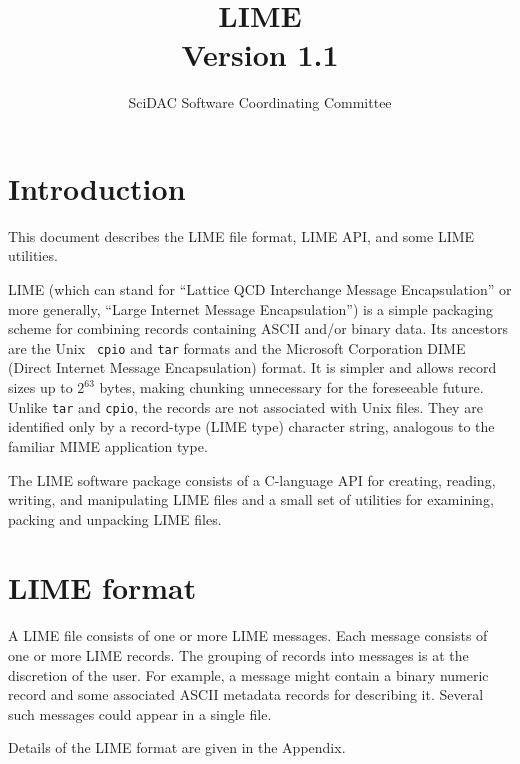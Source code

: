 \documentclass{article}
\begin{document}
\title{
   LIME \\{\large Version 1.1}
}
\author{ SciDAC Software Coordinating Committee}

\maketitle
\section{Introduction}

This document describes the LIME file format, LIME API, and some LIME
utilities.

LIME (which can stand for ``Lattice QCD Interchange Message
Encapsulation'' or more generally, ``Large Internet Message
Encapsulation'') is a simple packaging scheme for combining records
containing ASCII and/or binary data.  Its ancestors are the Unix {\tt
cpio} and {\tt tar} formats and the Microsoft Corporation DIME (Direct
Internet Message Encapsulation) format.  It is simpler and allows
record sizes up to $2^{63}$ bytes, making chunking unnecessary for the
foreseeable future.  Unlike {\tt tar} and {\tt cpio}, the records are
not associated with Unix files.  They are identified only by a
record-type (LIME type) character string, analogous to the familiar
MIME application type.

The LIME software package consists of a C-language API for creating,
reading, writing, and manipulating LIME files and a small set of
utilities for examining, packing and unpacking LIME files.

\section{LIME format}

A LIME file consists of one or more LIME messages.  Each message
consists of one or more LIME records.  The grouping of records into
messages is at the discretion of the user.  For example, a message
might contain a binary numeric record and some associated ASCII
metadata records for describing it.  Several such messages could
appear in a single file.

Details of the LIME format are given in the Appendix.
\end{document}
